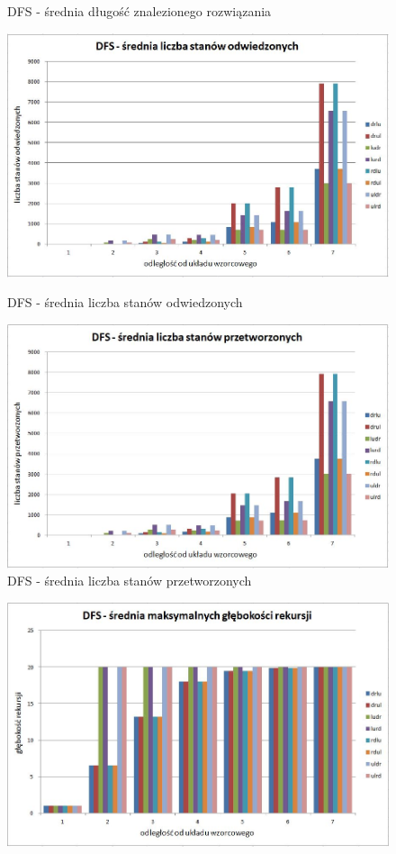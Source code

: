 \documentclass{classrep}
\begin{document}
{\begin{figure}[ht!]
\begin{center}
		\caption{DFS - średnia długość znalezionego rozwiązania}
	\end{center}
\end{figure}
\newpage
\begin{figure}[ht!]
	\begin{center}
		\vspace{0.3in}
		\includegraphics[scale=0.6]{dfs2}
		\caption{DFS - średnia liczba stanów odwiedzonych}
		\vspace{0.5in}
		\includegraphics[scale=0.6]{dfs3}
		\caption{DFS - średnia liczba stanów przetworzonych}
	\end{center}
\end{figure}
\newpage
\begin{figure}[ht!]
	\begin{center}
		\vspace{0.3in}
		\includegraphics[scale=0.6]{dfs4}

\end{center}
\end{figure}}
\end{document}
